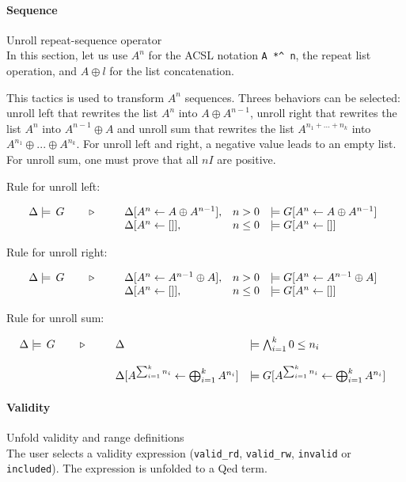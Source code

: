 \paragraph{Sequence} Unroll repeat-sequence operator\\
In this section, let us use $A^n$ for the ACSL notation \lstinline{A *^ n},
the repeat list operation, and $A \oplus l$ for the list concatenation.

This tactics is used to transform $A^n$ sequences. Threes behaviors
can be selected:
unroll left that rewrites the list  $A^n$ into $A \oplus A^{n-1}$,
unroll right that rewrites the list $A^n$ into $A^{n-1} \oplus A$
and unroll sum that rewrites the list $A ^{n_1 + ... + n_k}$
into $A^{n_1} \oplus ... \oplus A^{n_k}$. For unroll left and right,
a negative value leads to an empty list. For unroll sum, one must prove that all
$nI$ are positive.

Rule for unroll left:

\[
\TACTIC{\Delta\models\,G}{%
\begin{array}[t]{lll}
  \Delta[A^n\leftarrow A \oplus A^{n-1}],& n > 0 & \models G[A^n\leftarrow A \oplus A^{n-1}]\\
  \Delta[A^n\leftarrow []],& n \leq 0 & \models G[A^n\leftarrow []]
\end{array}
}\]

Rule for unroll right:

\[
\TACTIC{\Delta\models\,G}{%
\begin{array}[t]{lll}
  \Delta[A^n\leftarrow A^{n-1} \oplus A],& n > 0 & \models G[A^n\leftarrow A^{n-1} \oplus A]\\
  \Delta[A^n\leftarrow []],& n \leq 0 & \models G[A^n\leftarrow []]
\end{array}
}\]

Rule for unroll sum:

\[
\TACTIC{\Delta\models\,G}{%
\begin{array}[t]{ll}
  \Delta & \models\bigwedge_{i=1}^{k} 0 \leq n_i\\
  &\\
  \Delta[A^{\sum_{i=1}^{k}n_i}\leftarrow \bigoplus_{i=1}^{k} A^{n_i}] &
  \models G[A^{\sum_{i=1}^{k}n_i}\leftarrow \bigoplus_{i=1}^{k} A^{n_i}]
\end{array}
}\]

\paragraph{Validity} Unfold validity and range definitions\\
The user selects a validity expression (\lstinline{valid_rd},
\lstinline{valid_rw}, \lstinline{invalid} or \lstinline{included}).
The expression is unfolded to a \textsf{Qed} term.


